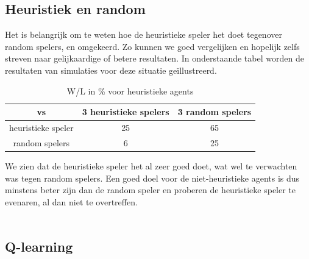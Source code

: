 \documentclass[11pt]{article}
\begin{document}
\subsection{Heuristiek en random}
Het is belangrijk om te weten hoe de heuristieke speler het doet tegenover random spelers, en omgekeerd. Zo kunnen we goed vergelijken en hopelijk zelfs streven naar gelijkaardige of betere resultaten. In onderstaande tabel worden de resultaten van simulaties voor deze situatie geïllustreerd.
\begin{table}[H]
        \centering
        \begin{tabular}{|c|c|c|}
                \hline
                  vs                & 3 heuristieke spelers & 3 random spelers \\
                \hline
                 heuristieke speler & 25         & 65\\
                 random spelers     & 6         & 25\\
                \hline
        \end{tabular}
        \caption{W/L in \% voor heuristieke agents}
\end{table}

We zien dat de heuristieke speler het al zeer goed doet, wat wel te verwachten was tegen random spelers. Een goed doel voor de niet-heuristieke agents is dus minstens beter zijn dan de random speler en proberen de heuristieke speler te evenaren, al dan niet te overtreffen.\\\\


\subsection{Q-learning}
\end{document}
